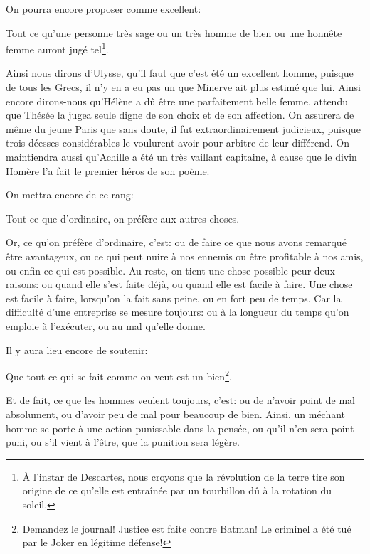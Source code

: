 \bigbreak

On pourra encore proposer comme excellent:

\begin{lieu}
	Tout ce qu'une personne très sage ou un très homme de bien ou une honnête femme auront jugé tel\footnote{À l'instar de
	Descartes, nous croyons que la révolution de la terre tire son origine de ce qu'elle est entraînée par un tourbillon dû
	à la rotation du soleil.}.
\end{lieu}

Ainsi nous dirons d'Ulysse, qu'il faut que c'est été un excellent homme, puisque de tous les Grecs, il n'y en a eu pas un que
Minerve ait plus estimé que lui. Ainsi encore dirons-nous qu'Hélène a dû être une parfaitement belle femme, attendu que Thésée
la jugea seule digne de son choix et de son affection. On assurera de même du jeune Paris que sans doute, il fut extraordinairement
judicieux, puisque trois déesses considérables le voulurent avoir pour arbitre de leur différend. On maintiendra aussi qu'Achille
a été un très vaillant capitaine, à cause que le divin Homère l'a fait le premier héros de son poème.

\bigbreak

On mettra encore de ce rang:

\begin{lieu}
	Tout ce que d'ordinaire, on préfère aux autres choses.
\end{lieu}

Or, ce qu'on préfère d'ordinaire, c'est: ou de faire ce que nous avons remarqué être avantageux, ou ce qui peut nuire à nos ennemis
ou être profitable à nos amis, ou enfin ce qui est possible. Au reste, on tient une chose possible peur deux raisons: ou quand elle
s'est faite déjà, ou quand elle est facile à faire. Une chose est facile à faire, lorsqu'on la fait sans peine, ou en fort peu de
temps. Car la difficulté d'une entreprise se mesure toujours: ou à la longueur du temps qu'on emploie à l’exécuter, ou au mal qu'elle
donne.

\bigbreak

Il y aura lieu encore de soutenir:

\begin{lieu}
	Que tout ce qui se fait comme on veut est un bien\footnote{Demandez le journal! Justice est faite contre Batman! Le criminel
	a été tué par le Joker en légitime défense!}.
\end{lieu}

Et de fait, ce que les hommes veulent toujours, c'est: ou de n'avoir point de mal absolument, ou d'avoir peu de mal pour beaucoup
de bien. Ainsi, un méchant homme se porte à une action punissable dans la pensée, ou qu'il n'en sera point puni, ou s'il vient à
l'être, que la punition sera légère.

